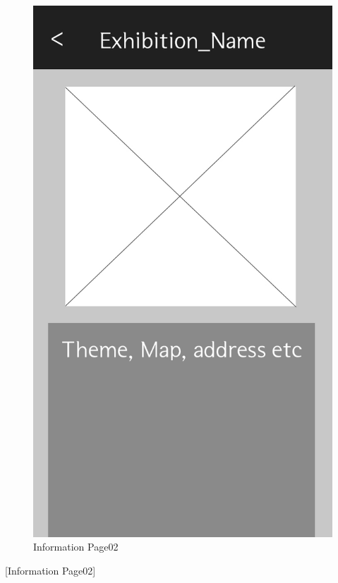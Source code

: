 \documentclass[conference]{IEEEtran}
\begin{document}
\begin{figure}[htbp]
\begin{center}
    \includegraphics[scale=0.2]{img_infoDetail}
    \caption{Information Page02} 
\end{center}
\end{figure}

[Information Page02]
\end{document}
